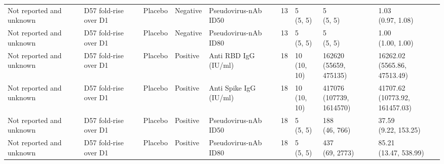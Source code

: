 \documentclass[]{book}
\theoremstyle{definition}
\theoremstyle{definition}
\theoremstyle{definition}
\newcommand{\1}{\mathbbm{1}}
\begin{document}
\begin{landscape}
\begin{ThreePartTable}
\begin{longtable}[t]{>{\raggedright\arraybackslash}p{2.7cm}llllllll}
\hspace{1em}Not reported and unknown & D57 fold-rise over D1 & Placebo & Negative & Pseudovirus-nAb ID50 & 13 & \makecell[l]{5\\(5, 5)} & \makecell[l]{5\\(5, 5)} & \makecell[l]{1.03\\(0.97, 1.08)}\\
\hspace{1em}Not reported and unknown & D57 fold-rise over D1 & Placebo & Negative & Pseudovirus-nAb ID80 & 13 & \makecell[l]{5\\(5, 5)} & \makecell[l]{5\\(5, 5)} & \makecell[l]{1.00\\(1.00, 1.00)}\\
\hspace{1em}Not reported and unknown & D57 fold-rise over D1 & Placebo & Positive & Anti RBD IgG (IU/ml) & 18 & \makecell[l]{10\\(10, 10)} & \makecell[l]{162620\\(55659, 475135)} & \makecell[l]{16262.02\\(5565.86, 47513.49)}\\
\hspace{1em}Not reported and unknown & D57 fold-rise over D1 & Placebo & Positive & Anti Spike IgG (IU/ml) & 18 & \makecell[l]{10\\(10, 10)} & \makecell[l]{417076\\(107739, 1614570)} & \makecell[l]{41707.62\\(10773.92, 161457.03)}\\
\hspace{1em}Not reported and unknown & D57 fold-rise over D1 & Placebo & Positive & Pseudovirus-nAb ID50 & 18 & \makecell[l]{5\\(5, 5)} & \makecell[l]{188\\(46, 766)} & \makecell[l]{37.59\\(9.22, 153.25)}\\
\hspace{1em}Not reported and unknown & D57 fold-rise over D1 & Placebo & Positive & Pseudovirus-nAb ID80 & 18 & \makecell[l]{5\\(5, 5)} & \makecell[l]{437\\(69, 2773)} & \makecell[l]{85.21\\(13.47, 538.99)}\\*
\end{longtable}
\end{ThreePartTable}



\end{landscape}
\end{document}
